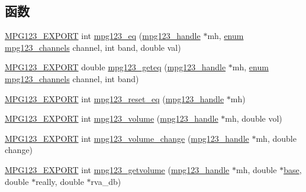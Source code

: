 \subsection*{函数}
\begin{DoxyCompactItemize}
\item 
\hyperlink{mpg123_8h_a2ba98cfba3f760879df70e755b2a61cc}{M\+P\+G123\+\_\+\+E\+X\+P\+O\+RT} int \hyperlink{group__mpg123__voleq_gae5121afbdada36c3dc3dd9450dfaaf07}{mpg123\+\_\+eq} (\hyperlink{group__mpg123__init_ga6728e2839a395f3a07d4514da659faca}{mpg123\+\_\+handle} $\ast$mh, \hyperlink{interfaceenum}{enum} \hyperlink{group__mpg123__voleq_gaf6ae0d8c593d295c36e7d20e9f892840}{mpg123\+\_\+channels} channel, int band, double val)
\item 
\hyperlink{mpg123_8h_a2ba98cfba3f760879df70e755b2a61cc}{M\+P\+G123\+\_\+\+E\+X\+P\+O\+RT} double \hyperlink{group__mpg123__voleq_gad03e2f5ca346ae488f708551db994ff7}{mpg123\+\_\+geteq} (\hyperlink{group__mpg123__init_ga6728e2839a395f3a07d4514da659faca}{mpg123\+\_\+handle} $\ast$mh, \hyperlink{interfaceenum}{enum} \hyperlink{group__mpg123__voleq_gaf6ae0d8c593d295c36e7d20e9f892840}{mpg123\+\_\+channels} channel, int band)
\item 
\hyperlink{mpg123_8h_a2ba98cfba3f760879df70e755b2a61cc}{M\+P\+G123\+\_\+\+E\+X\+P\+O\+RT} int \hyperlink{group__mpg123__voleq_ga3f118a7b7c333066ccad9006d933202a}{mpg123\+\_\+reset\+\_\+eq} (\hyperlink{group__mpg123__init_ga6728e2839a395f3a07d4514da659faca}{mpg123\+\_\+handle} $\ast$mh)
\item 
\hyperlink{mpg123_8h_a2ba98cfba3f760879df70e755b2a61cc}{M\+P\+G123\+\_\+\+E\+X\+P\+O\+RT} int \hyperlink{group__mpg123__voleq_gad3cf821056ba53d4a9caca2671485dc4}{mpg123\+\_\+volume} (\hyperlink{group__mpg123__init_ga6728e2839a395f3a07d4514da659faca}{mpg123\+\_\+handle} $\ast$mh, double vol)
\item 
\hyperlink{mpg123_8h_a2ba98cfba3f760879df70e755b2a61cc}{M\+P\+G123\+\_\+\+E\+X\+P\+O\+RT} int \hyperlink{group__mpg123__voleq_gaa0897be03a78daf11e28c0e7263a0ae1}{mpg123\+\_\+volume\+\_\+change} (\hyperlink{group__mpg123__init_ga6728e2839a395f3a07d4514da659faca}{mpg123\+\_\+handle} $\ast$mh, double change)
\item 
\hyperlink{mpg123_8h_a2ba98cfba3f760879df70e755b2a61cc}{M\+P\+G123\+\_\+\+E\+X\+P\+O\+RT} int \hyperlink{group__mpg123__voleq_ga33be27860acfd34d5d2a1d17cf72a15a}{mpg123\+\_\+getvolume} (\hyperlink{group__mpg123__init_ga6728e2839a395f3a07d4514da659faca}{mpg123\+\_\+handle} $\ast$mh, double $\ast$\hyperlink{structbase}{base}, double $\ast$really, double $\ast$rva\+\_\+db)
\end{DoxyCompactItemize}


